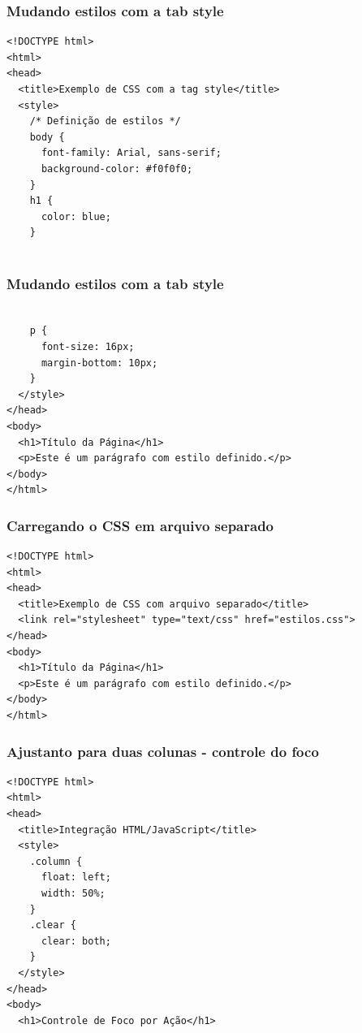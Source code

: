 \documentclass[13pt, xcolor={dvipsnames,svgnames}, portuguese]{beamer}
\begin{document}
\begin{frame}[fragile]
\frametitle{Mudando estilos com a tab style}

\begin{verbatim}
<!DOCTYPE html>
<html>
<head>
  <title>Exemplo de CSS com a tag style</title>
  <style>
    /* Definição de estilos */
    body {
      font-family: Arial, sans-serif;
      background-color: #f0f0f0;
    }
    h1 {
      color: blue;
    }
 
\end{verbatim}

\end{frame}
\begin{frame}[fragile]
\frametitle{Mudando estilos com a tab style}

\begin{verbatim}

    p {
      font-size: 16px;
      margin-bottom: 10px;
    }
  </style>
</head>
<body>
  <h1>Título da Página</h1>
  <p>Este é um parágrafo com estilo definido.</p>
</body>
</html>
\end{verbatim}

\end{frame}


\begin{frame}[fragile]
\frametitle{Carregando o CSS em arquivo separado}

\begin{verbatim}
<!DOCTYPE html>
<html>
<head>
  <title>Exemplo de CSS com arquivo separado</title>
  <link rel="stylesheet" type="text/css" href="estilos.css">
</head>
<body>
  <h1>Título da Página</h1>
  <p>Este é um parágrafo com estilo definido.</p>
</body>
</html>
\end{verbatim}

\end{frame}
\begin{frame}[fragile]
\frametitle{Ajustanto para duas colunas - controle do foco}

\begin{verbatim}
<!DOCTYPE html>
<html>
<head>
  <title>Integração HTML/JavaScript</title>
  <style>
    .column {
      float: left;
      width: 50%;
    }
    .clear {
      clear: both;
    }
  </style>
</head>
<body>
  <h1>Controle de Foco por Ação</h1>
\end{verbatim}

\end{frame}
\end{document}

